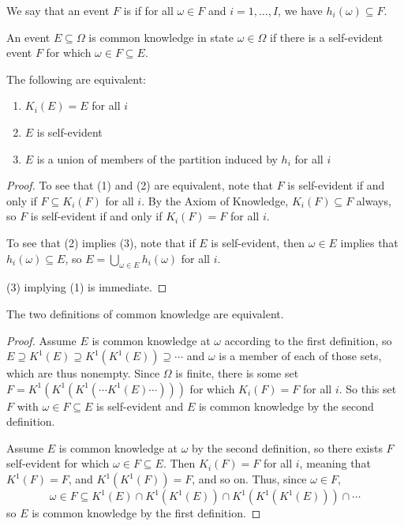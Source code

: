 \documentclass[10pt]{article}
\begin{document}
\begin{definition}
	We say that an event $F$ is  if for all $\omega \in F$ and $i = 1,\dots,I$, we have $h_i(\omega) \subseteq F$.
\end{definition}
\begin{definition}
	An event $E \subseteq \Omega$ is common knowledge in state $\omega \in \Omega$ if there is a self-evident event $F$ for which $\omega \in F \subseteq E$.
\end{definition}

\begin{lemma}
	The following are equivalent:
	\begin{enumerate}
		\item $K_i(E) = E$ for all $i$
		\item $E$ is self-evident
		\item $E$ is a union of members of the partition induced by $h_i$ for all $i$
	\end{enumerate}
\end{lemma}
\begin{proof}
	To see that (1) and (2) are equivalent, note that $F$ is self-evident if and only if $F \subseteq K_i(F)$ for all $i$. By the Axiom of Knowledge, $K_i(F) \subseteq F$ always, so $F$ is self-evident if and only if $K_i(F) = F$ for all $i$.
	
	To see that (2) implies (3), note that if $E$ is self-evident, then $\omega \in E$ implies that $h_i(\omega) \subseteq E$, so $E = \bigcup_{\omega \in E} h_i(\omega)$ for all $i$.
	
	(3) implying (1) is immediate.
\end{proof}

\begin{proposition}
	The two definitions of common knowledge are equivalent.
\end{proposition}
\begin{proof}
	Assume $E$ is common knowledge at $\omega$ according to the first definition, so $E \supseteq K^1(E) \supseteq K^1(K^1(E)) \supseteq \cdots$ and $\omega$ is a member of each of those sets, which are thus nonempty. Since $\Omega$ is finite, there is some set $F = K^1(K^1(K^1(\cdots K^1(E)\cdots)))$ for which $K_i(F) = F$ for all $i$. So this set $F$ with $\omega \in F \subseteq E$ is self-evident and $E$ is common knowledge by the second definition.
	
	Assume $E$ is common knowledge at $\omega$ by the second definition, so there exists $F$ self-evident for which $\omega \in F \subseteq E$. Then $K_i(F) = F$ for all $i$, meaning that $K^1(F) = F$, and $K^1(K^1(F)) = F$, and so on. Thus, since $\omega \in F$, \[\omega \in F \subseteq K^1(E) \cap K^1(K^1(E)) \cap K^1(K^1(K^1(E))) \cap \cdots\]so $E$ is common knowledge by the first definition.
\end{proof}
\end{document}
